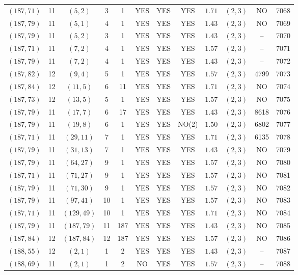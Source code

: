 \begin{longtable}{|c|c|c|c|c|c|c|c|c|c|c|c|}
$(187,71)$ & 11 & $(5,2)$ & 3 & 1 & YES & YES & YES & $1.71$ & $(2,3)$ & NO & 7068\\
$(187,79)$ & 11 & $(5,1)$ & 4 & 1 & YES & YES & YES & $1.43$ & $(2,3)$ & NO & 7069\\
$(187,79)$ & 11 & $(5,2)$ & 3 & 1 & YES & YES & YES & $1.43$ & $(2,3)$ & -- & 7070\\
$(187,71)$ & 11 & $(7,2)$ & 4 & 1 & YES & YES & YES & $1.57$ & $(2,3)$ & -- & 7071\\
$(187,79)$ & 11 & $(7,2)$ & 4 & 1 & YES & YES & YES & $1.43$ & $(2,3)$ & -- & 7072\\
$(187,82)$ & 12 & $(9,4)$ & 5 & 1 & YES & YES & YES & $1.57$ & $(2,3)$ & 4799 & 7073\\
$(187,84)$ & 12 & $(11,5)$ & 6 & 11 & YES & YES & YES & $1.71$ & $(2,3)$ & NO & 7074\\
$(187,73)$ & 12 & $(13,5)$ & 5 & 1 & YES & YES & YES & $1.57$ & $(2,3)$ & NO & 7075\\
$(187,79)$ & 11 & $(17,7)$ & 6 & 17 & YES & YES & YES & $1.43$ & $(2,3)$ & 8618 & 7076\\
$(187,79)$ & 11 & $(19,8)$ & 6 & 1 & YES & YES & NO(2) & $1.50$ & $(2,3)$ & 6802 & 7077\\
$(187,71)$ & 11 & $(29,11)$ & 7 & 1 & YES & YES & YES & $1.71$ & $(2,3)$ & 6135 & 7078\\
$(187,79)$ & 11 & $(31,13)$ & 7 & 1 & YES & YES & YES & $1.43$ & $(2,3)$ & NO & 7079\\
$(187,79)$ & 11 & $(64,27)$ & 9 & 1 & YES & YES & YES & $1.57$ & $(2,3)$ & NO & 7080\\
$(187,71)$ & 11 & $(71,27)$ & 9 & 1 & YES & YES & YES & $1.57$ & $(2,3)$ & NO & 7081\\
$(187,79)$ & 11 & $(71,30)$ & 9 & 1 & YES & YES & YES & $1.57$ & $(2,3)$ & NO & 7082\\
$(187,79)$ & 11 & $(97,41)$ & 10 & 1 & YES & YES & YES & $1.57$ & $(2,3)$ & NO & 7083\\
$(187,71)$ & 11 & $(129,49)$ & 10 & 1 & YES & YES & YES & $1.71$ & $(2,3)$ & NO & 7084\\
$(187,79)$ & 11 & $(187,79)$ & 11 & 187 & YES & YES & YES & $1.43$ & $(2,3)$ & NO & 7085\\
$(187,84)$ & 12 & $(187,84)$ & 12 & 187 & YES & YES & YES & $1.57$ & $(2,3)$ & NO & 7086\\
$(188,55)$ & 12 & $(2,1)$ & 1 & 2 & YES & YES & YES & $1.43$ & $(2,3)$ & -- & 7087\\
$(188,69)$ & 11 & $(2,1)$ & 1 & 2 & NO & YES & YES & $1.57$ & $(2,3)$ & -- & 7088\\

\end{longtable}
